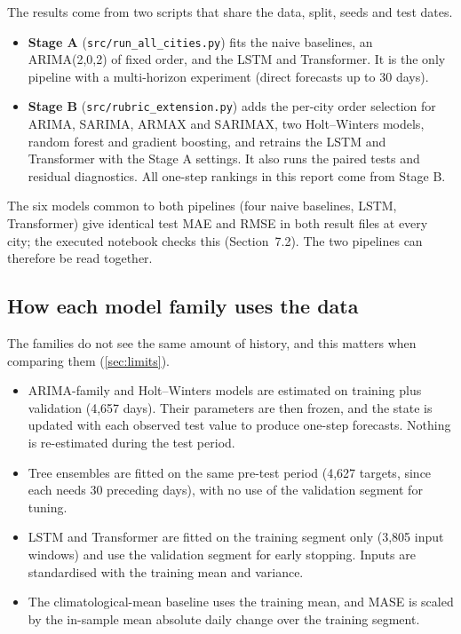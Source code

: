 \documentclass[11pt,a4paper]{article}
\begin{document}
The results come from two scripts that share the data, split, seeds and test dates.
\begin{itemize}
  \item \textbf{Stage A} (\nolinkurl{src/run_all_cities.py}) fits the naive baselines, an ARIMA(2,0,2) of fixed order, and the LSTM and Transformer. It is the only pipeline with a multi-horizon experiment (direct forecasts up to 30 days).
  \item \textbf{Stage B} (\nolinkurl{src/rubric_extension.py}) adds the per-city order selection for ARIMA, SARIMA, ARMAX and SARIMAX, two Holt--Winters models, random forest and gradient boosting, and retrains the LSTM and Transformer with the Stage A settings. It also runs the paired tests and residual diagnostics. All one-step rankings in this report come from Stage B.
\end{itemize}
The six models common to both pipelines (four naive baselines, LSTM, Transformer) give identical test MAE and RMSE in both result files at every city; the executed notebook checks this (Section~7.2). The two pipelines can therefore be read together.

\subsection{How each model family uses the data}

The families do not see the same amount of history, and this matters when comparing them (\cref{sec:limits}).
\begin{itemize}
  \item ARIMA-family and Holt--Winters models are estimated on training plus validation (4{,}657 days). Their parameters are then frozen, and the state is updated with each observed test value to produce one-step forecasts. Nothing is re-estimated during the test period.
  \item Tree ensembles are fitted on the same pre-test period (4{,}627 targets, since each needs 30 preceding days), with no use of the validation segment for tuning.
  \item LSTM and Transformer are fitted on the training segment only (3{,}805 input windows) and use the validation segment for early stopping. Inputs are standardised with the training mean and variance.
  \item The climatological-mean baseline uses the training mean, and MASE is scaled by the in-sample mean absolute daily change over the training segment.
\end{itemize}
\end{document}
